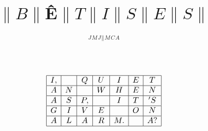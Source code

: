 \documentclass[titlepage, 12pt]{article}
\title{{$\|B\|$\^E$\|T\|I\|S\|E\|S\|$}}
\author{${}^J{}^M{}^J{}^\| {}^M{}^C{}^A$}
\date{}
\begin{document}
\maketitle

\begin{equation*}
    \left.
    \begin{array}{|c|c|c|c|c|c|c|}
        \hline I, & {} & Q & U & I & E & T \\
        \hline A & N & {} & W & H & E & N \\
        \hline A & S & P, & {} & I & T & 'S \\
        \hline G & I & V & E & {} & O & N \\
        \hline A & L & A & R & M. & {} & A? \\
        \hline 
    \end{array}
    \right.
\end{equation*}
\end{document}
